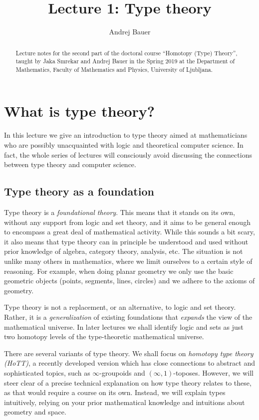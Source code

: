\documentclass{article}
\begin{document}
\title{Lecture 1: Type theory}
\author{Andrej Bauer}
\maketitle

\begin{abstract}
  Lecture notes for the second part of the doctoral course ``Homotopy (Type)
  Theory'', taught by Jaka Smrekar and Andrej Bauer in the Spring 2019 at the
  Department of Mathematics, Faculty of Mathematics and Physics, University of
  Ljubljana.
\end{abstract}


\section{What is type theory?}
\label{sec:what-type-theory}

In this lecture we give an introduction to type theory aimed at mathematicians
who are possibly unacquainted with logic and theoretical computer science. In
fact, the whole series of lectures will consciously avoid discussing the
connections between type theory and computer science.

\subsection{Type theory as a foundation}

Type theory is a \emph{foundational theory}. This means that it stands on its
own, without any support from logic and set theory, and it aims to be general
enough to encompass a great deal of mathematical activity. While this sounds a
bit scary, it also means that type theory can in principle be understood and
used without prior knowledge of algebra, category theory, analysis, etc. The
situation is not unlike many others in mathematics, where we limit ourselves to
a certain style of reasoning. For example, when doing planar geometry we only
use the basic geometric objects (points, segments, lines, circles) and we adhere
to the axioms of geometry.

Type theory is not a replacement, or an alternative, to logic and set theory.
Rather, it is a \emph{generalization} of existing foundations that
\emph{expands} the view of the mathematical universe. In later lectures we shall
identify logic and sets as just two homotopy levels of the type-theoretic
mathematical universe.

There are several variants of type theory. We shall focus on \emph{homotopy type
  theory (HoTT)}, a recently developed version which has close connections to
abstract and sophisticated topics, such as $\infty$-groupoids and
$(\infty,1)$-toposes. However, we will steer clear of a precise technical
explanation on how type theory relates to these, as that would require a course
on its own. Instead, we will explain types intuitively, relying on your prior
mathematical knowledge and intuitions about geometry and space.
\end{document}
